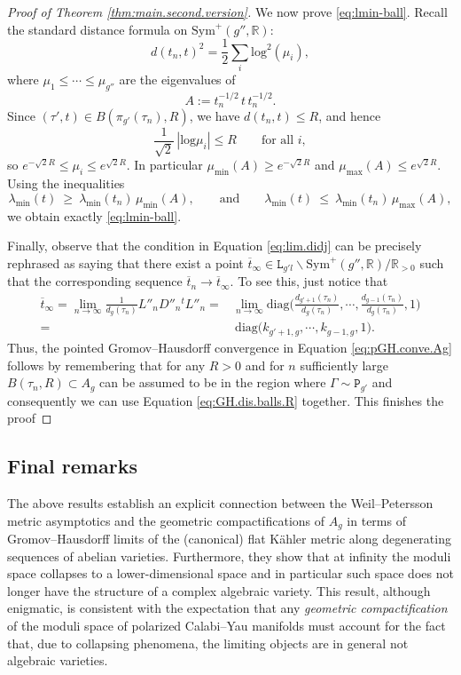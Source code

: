 \documentclass[11pt]{amsart}
\theoremstyle{plain}
\theoremstyle{definition}
\theoremstyle{remark}
\newcommand{\R}{\mathbb R}
\renewcommand{\log}{\mathrm{log}}
\newcommand{\sym}{\mathrm{Sym}^{\!+}}
\newcommand{\tP}{\mathtt{P}}
\newcommand{\tL}{\mathtt{L}}
\begin{document}
\begin{proof}[Proof of Theorem \ref{thm:main.second.version}]
    We now prove \eqref{eq:lmin-ball}. Recall the standard distance formula on $\sym(g'',\mathbb R)$:
    \[
        d(t_n,t)^2=\frac12\sum_i \log^2(\mu_i),
    \]
    where $\mu_1\le \cdots\le \mu_{g''}$ are the eigenvalues of
    \[
        A:=t_n^{-1/2}\,t\,t_n^{-1/2}.
    \]
    Since $(\tau',t)\in B(\pi_{g'}(\tau_n),R)$, we have $d(t_n,t)\le R$, and hence
    \[
    \frac{1}{\sqrt2}\,|\log \mu_i|\le R\qquad\text{for all }i,
    \]
    so $e^{-\sqrt2 R}\le \mu_i\le e^{\sqrt2 R}$. In particular $\mu_{\min}(A)\ge e^{-\sqrt2 R}$ and $\mu_{\max}(A)\le e^{\sqrt2 R}$. Using the inequalities
    \[
    \lambda_{\min}(t)\ \ge\ \lambda_{\min}(t_n)\,\mu_{\min}(A),
    \qquad\text{and}\qquad
    \lambda_{\min}(t)\ \le\ \lambda_{\min}(t_n)\,\mu_{\max}(A),
    \]
    we obtain exactly \eqref{eq:lmin-ball}.

    Finally, observe that the condition in Equation \eqref{eq:lim.didj} can be precisely rephrased as saying that there exist a point $\overline t_\infty \in \tL_{g'l}\backslash\sym(g'',\R)/\R_{>0}$ such that the corresponding sequence $\overline t_n\to \overline t_\infty$. To see this, just notice that 
    \begin{equation}
        \begin{aligned}
            \overline{t}_\infty=\lim_{n\to \infty}\frac{1}{d_{g}(\tau_n)}L''_nD''_n{}^tL''_n=&\lim_{n\to \infty}\mathrm{diag}\Biggl(\frac{d_{g'+1}(\tau_n)}{d_{g}(\tau_n)},\cdots,\frac{d_{g-1}(\tau_n)}{d_{g}(\tau_n)},1 \Biggr)\\[5pt]
            =&\:\mathrm{diag}\bigl(k_{g'+1,g},\cdots,k_{g-1,g},1).
        \end{aligned}
    \end{equation}
    Thus, the pointed Gromov--Hausdorff convergence in Equation \eqref{eq:pGH.conve.Ag} follows by remembering that for any $R>0$ and for $n$ sufficiently large $B(\tau_n,R)\subset A_g$ can be assumed to be in the region where $\Gamma\sim \tP_{g'}$ and consequently we can use Equation \eqref{eq:GH.dis.balls.R} together. This finishes the proof 
\end{proof}

\subsection{Final remarks}

The above results establish an explicit connection between the Weil--Petersson metric asymptotics and the geometric compactifications of $A_g$ in terms of Gromov--Hausdorff limits of the (canonical) flat K\"ahler metric along degenerating sequences of abelian varieties. Furthermore, they show that at infinity the moduli space collapses to a lower-dimensional space and in particular such space does not longer have the structure of a complex algebraic variety. This result, although enigmatic, is consistent with the expectation that any \emph{geometric compactification} of the moduli space of polarized Calabi--Yau manifolds must account for the fact that, due to collapsing phenomena, the limiting objects are in general not algebraic varieties. 
\end{document}
